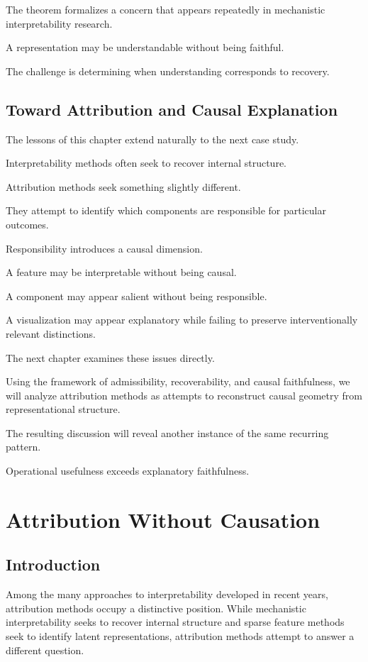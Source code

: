 \documentclass[11pt,oneside,openany]{book}
\begin{document}
The theorem formalizes a concern that appears repeatedly in mechanistic interpretability research.

A representation may be understandable without being faithful.

The challenge is determining when understanding corresponds to recovery.

\section{Toward Attribution and Causal Explanation}

The lessons of this chapter extend naturally to the next case study.

Interpretability methods often seek to recover internal structure.

Attribution methods seek something slightly different.

They attempt to identify which components are responsible for particular outcomes.

Responsibility introduces a causal dimension.

A feature may be interpretable without being causal.

A component may appear salient without being responsible.

A visualization may appear explanatory while failing to preserve interventionally relevant distinctions.

The next chapter examines these issues directly.

Using the framework of admissibility, recoverability, and causal faithfulness, we will analyze attribution methods as attempts to reconstruct causal geometry from representational structure.

The resulting discussion will reveal another instance of the same recurring pattern.

Operational usefulness exceeds explanatory faithfulness.

\chapter{Attribution Without Causation}

\section{Introduction}

Among the many approaches to interpretability developed in recent years, attribution methods occupy a distinctive position. While mechanistic interpretability seeks to recover internal structure and sparse feature methods seek to identify latent representations, attribution methods attempt to answer a different question.
\end{document}
